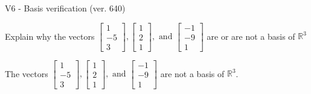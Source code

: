 \begin{exercise}
  \begin{exerciseTitle}V6 - Basis verification (ver. 640)\end{exerciseTitle}
  \begin{exerciseStatement}
    Explain why the vectors \(\left[\begin{array}{r}
1 \\
-5 \\
3
\end{array}\right] , \left[\begin{array}{r}
1 \\
2 \\
1
\end{array}\right] , \text{ and } \left[\begin{array}{r}
-1 \\
-9 \\
1
\end{array}\right]\) are or are not a basis of \(\mathbb{R}^3\)	


  \end{exerciseStatement}
  \begin{exerciseAnswer}
   The vectors \(\left[\begin{array}{r}
1 \\
-5 \\
3
\end{array}\right] , \left[\begin{array}{r}
1 \\
2 \\
1
\end{array}\right] , \text{ and } \left[\begin{array}{r}
-1 \\
-9 \\
1
\end{array}\right]\) 
  	 are not  a basis of \(\mathbb{R}^3\).
  


  \end{exerciseAnswer}
\end{exercise}